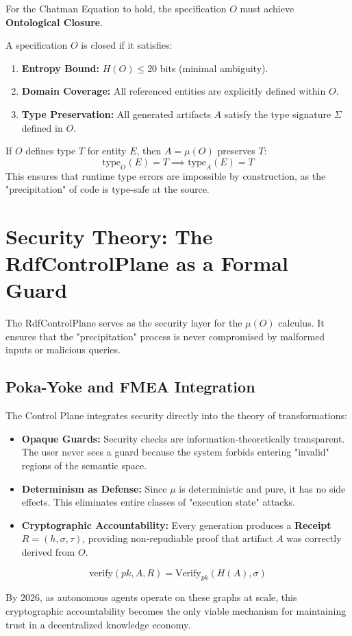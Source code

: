 For the Chatman Equation to hold, the specification $O$ must achieve \textbf{Ontological Closure}.

\begin{definition}
    A specification $O$ is closed if it satisfies:
    \begin{enumerate}
        \item \textbf{Entropy Bound:} $H(O) \leq 20$ bits (minimal ambiguity).
        \item \textbf{Domain Coverage:} All referenced entities are explicitly defined within $O$.
        \item \textbf{Type Preservation:} All generated artifacts $A$ satisfy the type signature $\Sigma$ defined in $O$.
    \end{enumerate}
\end{definition}

\begin{theorem}
    If $O$ defines type $T$ for entity $E$, then $A = \mu(O)$ preserves $T$:
    \begin{equation}
        \text{type}_O(E) = T \implies \text{type}_A(E) = T
    \end{equation}
    This ensures that runtime type errors are impossible by construction, as the "precipitation" of code is type-safe at the source.
\end{theorem}

\section{Security Theory: The RdfControlPlane as a Formal Guard}

The RdfControlPlane serves as the security layer for the $\mu(O)$ calculus. It ensures that the "precipitation" process is never compromised by malformed inputs or malicious queries.

\subsection{Poka-Yoke and FMEA Integration}

The Control Plane integrates security directly into the theory of transformations:
\begin{itemize}
    \item \textbf{Opaque Guards:} Security checks are information-theoretically transparent. The user never sees a guard because the system forbids entering "invalid" regions of the semantic space.
    \item \textbf{Determinism as Defense:} Since $\mu$ is deterministic and pure, it has no side effects. This eliminates entire classes of "execution state" attacks.
    \item \textbf{Cryptographic Accountability:} Every generation produces a \textbf{Receipt} $R = (h, \sigma, \tau)$, providing non-repudiable proof that artifact $A$ was correctly derived from $O$.
\end{itemize}

\begin{equation}
    \text{verify}(pk, A, R) = \text{Verify}_{pk}(H(A), \sigma)
\end{equation}

By 2026, as autonomous agents operate on these graphs at scale, this cryptographic accountability becomes the only viable mechanism for maintaining trust in a decentralized knowledge economy.
